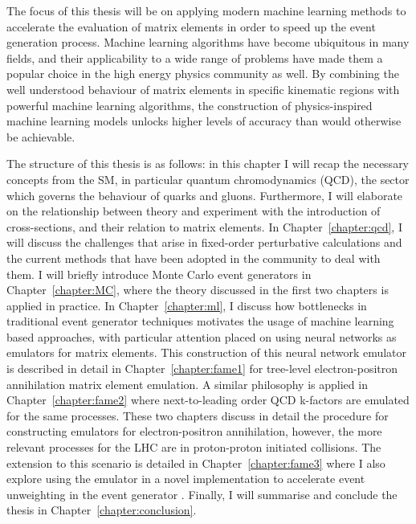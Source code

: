 \documentclass[main.tex]{subfiles}
\begin{document}
The focus of this thesis will be on applying modern
machine learning methods to accelerate the evaluation
of matrix elements in order to speed up the event
generation process. Machine learning algorithms
have become ubiquitous in many fields, and their applicability
to a wide range of problems have made them a popular choice
in the high energy physics community as well. By combining the
well understood behaviour of matrix elements in specific
kinematic regions with powerful machine learning
algorithms, the construction of physics-inspired machine
learning models unlocks higher levels of accuracy
than would otherwise be achievable.

The structure of this thesis is as follows: in this chapter
I will recap the necessary concepts from the SM,
in particular quantum chromodynamics (QCD), the sector
which governs the behaviour of quarks and gluons. Furthermore,
I will elaborate on the relationship between theory and experiment
with the introduction of cross-sections, and their relation
to matrix elements.
In Chapter~\ref{chapter:qcd}, I will discuss the challenges that arise
in fixed-order perturbative calculations and the current methods
that have been adopted in the community to deal with them.
I will briefly introduce Monte Carlo event generators in
Chapter~\ref{chapter:MC}, where the theory discussed in the first
two chapters is applied in practice. In Chapter~\ref{chapter:ml},
I discuss how bottlenecks in traditional event generator techniques
motivates the usage of machine learning based approaches, with
particular attention placed on using neural networks as emulators
for matrix elements.
This construction of this neural network emulator is
described in detail in Chapter~\ref{chapter:fame1} for tree-level
electron-positron annihilation matrix element emulation.
A similar philosophy is applied in Chapter~\ref{chapter:fame2}
where next-to-leading order QCD k-factors are emulated for
the same processes.
These two chapters discuss in detail the procedure for
constructing emulators for electron-positron annihilation,
however, the more relevant processes for the LHC are in
proton-proton initiated collisions. The extension
to this scenario is detailed in Chapter~\ref{chapter:fame3}
where I also explore using the
emulator in a novel implementation to accelerate event unweighting
in the event generator {\Sherpa}.
Finally, I will summarise and conclude the thesis in
Chapter~\ref{chapter:conclusion}.
\end{document}
